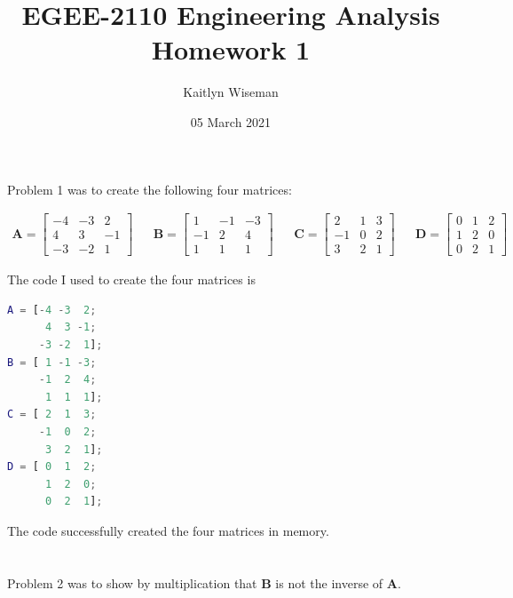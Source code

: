 \documentclass{article}
\title{EGEE-2110 Engineering Analysis \\ Homework 1}
\author{Kaitlyn Wiseman}
\date{05 March 2021}
\begin{document}
\maketitle

\newpage

\section{}

Problem 1 was to create the following four matrices:

\begin{align*}
    \textbf{A} = \begin{bmatrix}
    -4 & -3 & 2\\
    4 & 3 & -1\\
    -3 & -2 & 1
    \end{bmatrix} &&
    \textbf{B} = \begin{bmatrix}
    1 & -1 & -3\\
    -1 & 2 & 4\\
    1 & 1 & 1
    \end{bmatrix} &&
    \textbf{C} = \begin{bmatrix}    
    2 & 1 & 3\\
    -1 & 0 & 2\\
    3 & 2 & 1
    \end{bmatrix} &&
    \textbf{D} = \begin{bmatrix}
    0 & 1 & 2\\
    1 & 2 & 0\\
    0 & 2 & 1
    \end{bmatrix}
\end{align*}

The code I used to create the four matrices is

\begin{lstlisting}[language=Matlab]
% Create 4 matrices:
A = [-4 -3  2;
      4  3 -1;
     -3 -2  1];
B = [ 1 -1 -3;
     -1  2  4;
      1  1  1];
C = [ 2  1  3;
     -1  0  2;
      3  2  1];
D = [ 0  1  2;
      1  2  0;
      0  2  1];
\end{lstlisting}

The code successfully created the four matrices in memory.

\section{}

Problem 2 was to show by multiplication that \textbf{B} is not the inverse of \textbf{A}.
\end{document}
